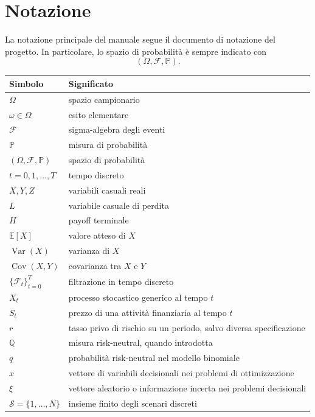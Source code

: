 \documentclass[oneside,openany]{memoir}%
\newcommand{\1}{\mathbf{1}}
\begin{document}
\chapter*{Notazione}


La notazione principale del manuale segue il documento di notazione del
progetto. In particolare, lo spazio di probabilit\`{a} \`{e} sempre indicato
con
\[
(\Omega,\mathcal{F},\mathbb{P}).
\]


\begin{center}%
\begin{tabular}
[c]{ll}\hline
Simbolo & Significato\\\hline
$\Omega$ & spazio campionario\\
$\omega\in\Omega$ & esito elementare\\
$\mathcal{F}$ & sigma-algebra degli eventi\\
$\mathbb{P}$ & misura di probabilit\`{a}\\
$(\Omega,\mathcal{F},\mathbb{P})$ & spazio di probabilit\`{a}\\
$t=0,1,\ldots,T$ & tempo discreto\\
$X,Y,Z$ & variabili casuali reali\\
$L$ & variabile casuale di perdita\\
$H$ & payoff terminale\\
$\mathbb{E}[X]$ & valore atteso di $X$\\
$\operatorname{Var}(X)$ & varianza di $X$\\
$\operatorname{Cov}(X,Y)$ & covarianza tra $X$ e $Y$\\
$\{\mathcal{F}_{t}\}_{t=0}^{T}$ & filtrazione in tempo discreto\\
$X_{t}$ & processo stocastico generico al tempo $t$\\
$S_{t}$ & prezzo di una attivit\`{a} finanziaria al tempo $t$\\
$r$ & tasso privo di rischio su un periodo, salvo diversa specificazione\\
$\mathbb{Q}$ & misura risk-neutral, quando introdotta\\
$q$ & probabilit\`{a} risk-neutral nel modello binomiale\\
$x$ & vettore di variabili decisionali nei problemi di ottimizzazione\\
$\xi$ & vettore aleatorio o informazione incerta nei problemi decisionali\\
$\mathcal{S}=\{1,\ldots,N\}$ & insieme finito degli scenari discreti\\

\end{tabular}
\end{center}
\end{document}
